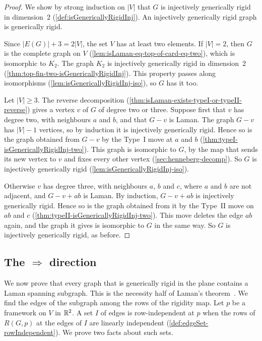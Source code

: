 \begin{proof}
  \leanok
  We show by strong induction on $|V|$ that $G$ is injectively
  generically rigid in dimension~$2$ (\cref{def:isGenericallyRigidInj}).
  An injectively generically rigid graph is generically rigid.

  Since $|E(G)| + 3 = 2|V|$, the set $V$ has at least two elements. If
  $|V| = 2$, then $G$ is the complete graph on $V$
  (\cref{lem:isLaman-eq-top-of-card-eq-two}), which is isomorphic to
  $K_2$. The graph $K_2$ is injectively generically rigid in
  dimension~$2$ (\cref{thm:top-fin-two-isGenericallyRigidInj}). This
  property passes along isomorphisms
  (\cref{lem:isGenericallyRigidInj-iso}), so $G$ has it too.

  Let $|V| \ge 3$. The reverse decomposition
  (\cref{thm:isLaman-exists-typeI-or-typeII-reverse}) gives a vertex
  $v$ of $G$ of degree two or three. Suppose first that $v$ has degree
  two, with neighbours $a$ and $b$, and that $G - v$ is Laman. The
  graph $G - v$ has $|V| - 1$ vertices, so by induction it is
  injectively generically rigid. Hence so is the graph obtained from
  $G - v$ by the Type~I move at $a$ and $b$
  (\cref{thm:typeI-isGenericallyRigidInj-two}). This graph is
  isomorphic to $G$, by the map that sends its new vertex to $v$ and
  fixes every other vertex (\cref{sec:henneberg-decomp}). So $G$ is
  injectively generically rigid (\cref{lem:isGenericallyRigidInj-iso}).

  Otherwise $v$ has degree three, with neighbours $a$, $b$ and $c$,
  where $a$ and $b$ are not adjacent, and $G - v + ab$ is Laman. By
  induction, $G - v + ab$ is injectively generically rigid. Hence so is
  the graph obtained from it by the Type~II move on $ab$ and $c$
  (\cref{thm:typeII-isGenericallyRigidInj-two}). This move deletes the
  edge $ab$ again, and the graph it gives is isomorphic to $G$ in the
  same way. So $G$ is injectively generically rigid, as before.
\end{proof}

\subsection{The \texorpdfstring{$\Rightarrow$}{=>} direction}

We now prove that every graph that is generically rigid in the plane
contains a Laman spanning subgraph. This is the necessity half of
Laman's theorem~\cite{laman1970}. We find the edges of the subgraph
among the rows of the rigidity map. Let $p$ be a framework on $V$ in
${\mathbb{R}}^{2}$. A set $I$ of edges is row-independent at $p$ when the rows of
$R(G, p)$ at the edges of $I$ are linearly independent
(\cref{def:edgeSet-rowIndependent}). We prove two facts about such
sets.

